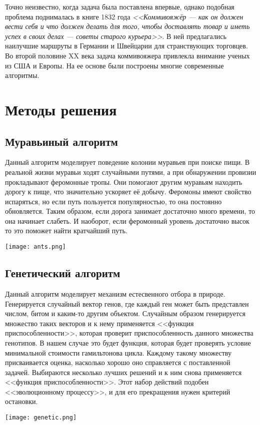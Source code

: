 \documentclass[a4paper, 12pt] {article}
\begin{document}
\noindent Точно неизвестно, когда задача была поставлена впервые, однако подобная проблема поднималась в книге 1832 года \textit{<<Коммивояжёр — как он должен вести себя и что должен делать для того, чтобы доставлять товар и иметь успех в своих делах — советы старого курьера>>}. В ней предлагались наилучшие маршруты в Германии и Швейцарии для странствующих торговцев. Во второй половине XX века задача коммивояжера привлекла внимание ученых из США и Европы. На ее основе были построены многие современные алгоритмы.

\newpage

\section{Методы решения}
\subsection{Муравьиный алгоритм}
Данный алгоритм моделирует поведение колонии муравьев при поиске пищи. В реальной жизни муравьи ходят случайными путями, а при обнаружении провизии прокладывают феромонные тропы. Они помогают другим муравьям находить дорогу к пище, что значительно ускоряет её добычу. Феромоны имеют свойство испаряться, но если путь пользуется популярностью, то она постоянно обновляется. Таким образом, если дорога занимает достаточно много времени, то она начинает слабеть. И наоборот, если феромонный уровень достаточно высок то это поможет найти кратчайший путь.
\begin{center}
\texttt{[image: ants.png]}
\end{center}
\newpage

\subsection{Генетический алгоритм}
Данный алгоритм моделирует механизм естесвенного отбора в природе. Генерируется случайный вектор генов, где каждый ген может быть представлен числом, битом и каким-то другим объектом. Случайным образом генерируется множество таких векторов и к нему применяется <<функция приспособленности>>, которая проверит приспособленность данного множества генотипов. В нашем случае это будет функция, которая будет проверять условие минимальной стоимости гамильтонова цикла. Каждому такому множеству присваивается оценка, насколько хорошо оно справляется с поставленной задачей. Выбираются несколько лучших решений и к ним снова применяется <<функция приспособленности>>. Этот набор действий подобен <<эволюционному процессу>>, и для его прекращения нужен критерий остановки. 
\begin{center}
\texttt{[image: genetic.png]}
\end{center}
\end{document}
